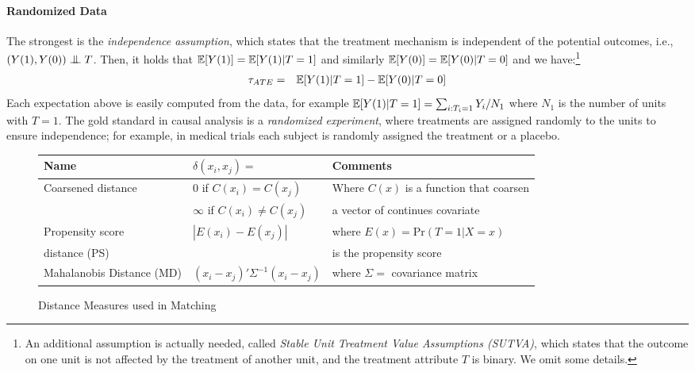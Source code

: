 \paragraph*{Randomized Data}
The strongest is the {\em independence assumption}, which states that
the treatment mechanism is independent of the potential outcomes,
i.e., $(Y(1), Y(0)) \bigCI T$. Then, it holds that
$\mathbb{E}[Y(1)]=\mathbb{E}[Y(1)|T=1]$ and similarly $\mathbb{E}[Y(0)]=\mathbb{E}[Y(0)|T=0]$ and we
have:\footnote{An additional assumption is actually needed, called
  \emph{Stable Unit Treatment Value Assumptions (SUTVA)}, which states
  that the outcome on one unit is not affected by the treatment of
  another unit, and the treatment attribute $T$ is binary.  We omit
  some details.}
%
\vspace{-.1cm}
\begin{eqnarray}
  {\tau_{ATE}} &=& \mathbb{E}[Y(1)|T=1]-\mathbb{E}[Y(0)|T=0] \label{eq:indeass}
\end{eqnarray}
Each expectation above is easily computed from the data, for example
$\mathbb{E}[Y(1)|T=1] = \sum_{i: T_i=1} Y_i / N_1$ where $N_1$ is the number
of units with $T=1$.  The gold standard in causal analysis is a {\em
  randomized experiment}, where treatments are assigned randomly to
the units to ensure independence; for example, in medical trials each
subject is randomly assigned the treatment or a placebo.
\begin{figure*} \scriptsize
  \centering
  \begin{tabular}{|l|l|l|} \hline
    \bf{Name} &  $\delta(x_i,x_j)=$ & \bf{Comments} \\ \hline
Coarsened distance & 0 if $C(x_i)=C(x_j)$ & Where $C(x)$ is a function that coarsen \\
               & $\infty$ if $C(x_i) \neq C(x_j)$ & a vector of continues covariate~\cite{IacKinPor09}\\ \hline
Propensity score  & $|E(x_i) - E(x_j)|$ & where $E(x) = \textrm{Pr}(T = 1 | X=x)$\\
distance (PS)   &  & is the propensity score~\cite{Rubin1983b} \\ \hline
Mahalanobis Distance (MD) & $(x_i-x_j)'\Sigma^{-1} (x_i-x_j)$ & where $\Sigma=$ covariance matrix~\cite{Stuart10} \\ \hline
  \end{tabular}
  \caption{Distance Measures used in Matching}
  \label{fig:metrics}
\end{figure*}
\vspace{-0.3cm}
